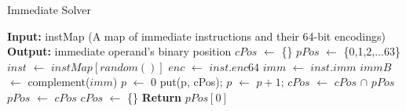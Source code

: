 \begin{algorithm}[htbp]
    \caption{Immediate Solver} %
      \label{algo:int_solver}
  \begin{algorithmic}[1]
	  \State \textbf{Input:} instMap (A map of immediate instructions and their 64-bit encodings)
      \State \textbf{Output:} immediate operand's binary position
      \State $cPos$ $\gets$ \{\} 
      \State $pPos$ $\gets$ \{0,1,2,...63\} 
      \State $inst$ $\gets$ $instMap[random()]$ 
      \State $enc$ $\gets$ $inst.enc64$ 
      \State $imm$ $\gets$ $inst.imm$ 
      \State $immB$ $\gets$ complement($imm$)
      \State $p$ $\gets$ 0
      \State put(p, cPos); $p$ $\gets$ $p+1$;
      \EndIf
      \EndWhile
      \State $cPos$ $\gets$ $cPos$ $\cap$ $pPos$
      \State $pPos$ $\gets$ $cPos$
      \State $cPos$ $\gets$ \{\}
      \EndWhile
      \State \textbf{Return} $pPos[0]$
  \end{algorithmic}
\end{algorithm}

